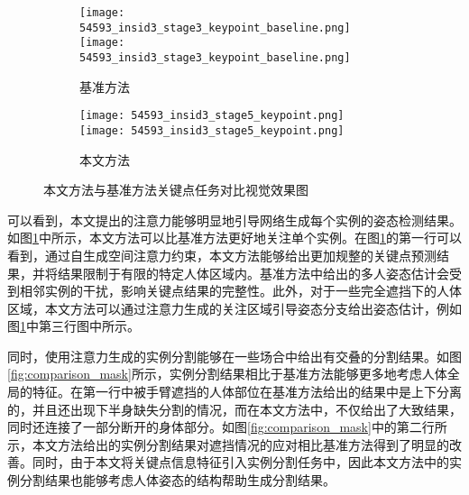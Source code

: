 \begin{figure}[H]
\begin{minipage}{\linewidth}
		\vskip5pt
		\begin{subfigure}[b]{0.45\linewidth}
			\centering
			\begin{minipage}{\linewidth}
				\texttt{[image: 54593\_insid3\_stage3\_keypoint\_baseline.png]}
				{\texttt{[image: 54593\_insid3\_stage3\_keypoint\_baseline.png]}}
			\end{minipage}
			\caption{基准方法\cite{wei2016convolutional}}
		\end{subfigure}
		\begin{subfigure}[b]{0.45\linewidth}
			\centering
			\begin{minipage}{\linewidth}
				\texttt{[image: 54593\_insid3\_stage5\_keypoint.png]}
				{\texttt{[image: 54593\_insid3\_stage5\_keypoint.png]}}
			\end{minipage}
		\caption{本文方法}
		\end{subfigure}
	\end{minipage}
	\caption{本文方法与基准方法关键点任务对比视觉效果图}
	\label{fig:comparison_keypoint}
\end{figure}

可以看到，本文提出的注意力能够明显地引导网络生成每个实例的姿态检测结果。如图\ref{fig:comparison_keypoint}中所示，本文方法可以比基准方法更好地关注单个实例。在图\ref{fig:comparison_keypoint}的第一行可以看到，通过自生成空间注意力约束，本文方法能够给出更加规整的关键点预测结果，并将结果限制于有限的特定人体区域内。基准方法中给出的多人姿态估计会受到相邻实例的干扰，影响关键点结果的完整性。此外，对于一些完全遮挡下的人体区域，本文方法可以通过注意力生成的关注区域引导姿态分支给出姿态估计，例如图\ref{fig:comparison_keypoint}中第三行图中所示。

同时，使用注意力生成的实例分割能够在一些场合中给出有交叠的分割结果。如图\ref{fig:comparison_mask}所示，实例分割结果相比于基准方法能够更多地考虑人体全局的特征。在第一行中被手臂遮挡的人体部位在基准方法给出的结果中是上下分离的，并且还出现下半身缺失分割的情况，而在本文方法中，不仅给出了大致结果，同时还连接了一部分断开的身体部分。如图\ref{fig:comparison_mask}中的第二行所示，本文方法给出的实例分割结果对遮挡情况的应对相比基准方法得到了明显的改善。同时，由于本文将关键点信息特征引入实例分割任务中，因此本文方法中的实例分割结果也能够考虑人体姿态的结构帮助生成分割结果。

